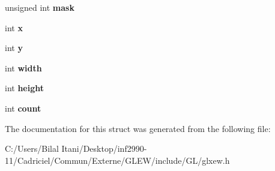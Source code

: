 \begin{DoxyCompactItemize}
\item 
unsigned int {\bfseries mask}\hypertarget{struct_g_l_x_buffer_clobber_event_s_g_i_x_a74b4ad1ad3cac011001151411f621da1}{}\label{struct_g_l_x_buffer_clobber_event_s_g_i_x_a74b4ad1ad3cac011001151411f621da1}

\item 
int {\bfseries x}\hypertarget{struct_g_l_x_buffer_clobber_event_s_g_i_x_a5118d48c3c8d5253d39922b5014b52ff}{}\label{struct_g_l_x_buffer_clobber_event_s_g_i_x_a5118d48c3c8d5253d39922b5014b52ff}

\item 
int {\bfseries y}\hypertarget{struct_g_l_x_buffer_clobber_event_s_g_i_x_aef21efa11558a5b67861f96471c56003}{}\label{struct_g_l_x_buffer_clobber_event_s_g_i_x_aef21efa11558a5b67861f96471c56003}

\item 
int {\bfseries width}\hypertarget{struct_g_l_x_buffer_clobber_event_s_g_i_x_adad23535733161528427584a42bfc6eb}{}\label{struct_g_l_x_buffer_clobber_event_s_g_i_x_adad23535733161528427584a42bfc6eb}

\item 
int {\bfseries height}\hypertarget{struct_g_l_x_buffer_clobber_event_s_g_i_x_a7838dbabb76c22aa8241310a3f2363ea}{}\label{struct_g_l_x_buffer_clobber_event_s_g_i_x_a7838dbabb76c22aa8241310a3f2363ea}

\item 
int {\bfseries count}\hypertarget{struct_g_l_x_buffer_clobber_event_s_g_i_x_ad8f4f0aae058e0a1ff542679823e37a9}{}\label{struct_g_l_x_buffer_clobber_event_s_g_i_x_ad8f4f0aae058e0a1ff542679823e37a9}

\end{DoxyCompactItemize}


The documentation for this struct was generated from the following file\+:\begin{DoxyCompactItemize}
\item 
C\+:/\+Users/\+Bilal Itani/\+Desktop/inf2990-\/11/\+Cadriciel/\+Commun/\+Externe/\+G\+L\+E\+W/include/\+G\+L/glxew.\+h\end{DoxyCompactItemize}
